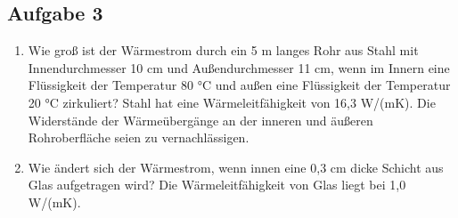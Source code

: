 \documentclass[a4paper,11pt]{article}
\newif\ifshowme
\begin{document}
\subsection*{Aufgabe 3}

\begin{enumerate}[label=\alph*),itemsep=-3mm]

\item 
Wie groß ist der Wärmestrom durch ein 5 m langes Rohr aus Stahl mit
Innendurchmesser 10 cm und Außendurchmesser 11 cm, wenn im Innern eine
Flüssigkeit der Temperatur 80 °C und außen eine Flüssigkeit der Temperatur
20 °C zirkuliert? Stahl hat eine Wärmeleitfähigkeit von 16,3 W/(mK). Die
Widerstände der Wärmeübergänge an der inneren und äußeren Rohroberfläche
seien zu vernachlässigen.




\begin{marginfigure}[-3cm]
\caption{Stahlrohr mit innerer Glasschicht.}
\end{marginfigure}


\ifshowme
\antwort{
\begin{align*}
\dot{Q} &= (T_i - T_a) \frac{2 \pi l \cdot \lambda}{\ln(\frac{r_i}{r_a})} \\
\dot{Q} &= 60~ \text{°C} \cdot \frac{2 \pi \cdot 5~\text{m} \cdot 16,3~ \text{W/m°C} }{\ln(\frac{55}{50})} \\
	&= 322.366,15~ \text{W}
\end{align*}
}



\pagebreak
\else
\fi


\item Wie ändert sich der Wärmestrom, wenn innen eine 0,3 cm dicke Schicht aus
Glas aufgetragen wird? Die Wärmeleitfähigkeit von Glas liegt bei 1,0 W/(mK).
\end{enumerate}

\ifshowme
\antwort{
\begin{align*}
\dot{Q} &= 2 \pi \cdot l \cdot (T_i - T_a) \cdot \left( \frac{\ln(\frac{r_{SA}}{r_{SI}})}{\lambda_1} + \frac{\ln(\frac{r_{GA}}{r_{GI}})}{\lambda_2} \right)^{-1} \\
\dot{Q} &= 2 \pi \cdot 5m \cdot 60~ \text{°C} \cdot \left( {\frac{\ln(\frac{0,055}{0,05})}{16,3~ \text{W/m°C}} + \frac{\ln(\frac{0,05}{0,047})}{1~ \text{W/m°C}}} \right)^{-1} \\
	&= 27.833,46~ \text{W}
\end{align*}
}
\else
\fi
\end{document}
